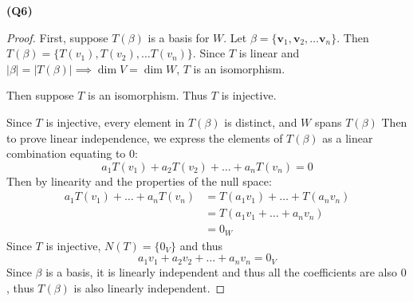 \documentclass[12pt, a4paper]{article}
\begin{document}
\textbf{(Q6)}

\begin{proof}
    First, suppose $T(\beta)$ is a basis for $W$. Let
    $\beta = \{\mathbf{v}_1, \mathbf{v}_2, \ldots \mathbf{v}_n\}$. Then
    $T(\beta) = \{T(v_1), T(v_2), \ldots T(v_n)\}$.
    Since $T$ is linear and $|\beta| = |T(\beta)| \implies \dim V = \dim W$,
    $T$ is an isomorphism.
    
    Then suppose $T$ is an isomorphism. Thus $T$ is injective.

    Since $T$ is injective, every element in $T(\beta)$ is distinct, and
    $W$ spans $T(\beta)$
    Then to prove linear independence, we express the elements of
    $T(\beta)$ as a linear combination equating to 0:
    \[
        a_1T(v_1) + a_2T(v_2) + \ldots + a_nT(v_n) = 0
    \]
    Then by linearity and the properties of the null space:
    \begin{align*}
        a_1T(v_1) + \ldots + a_nT(v_n) & = T(a_1v_1) + \ldots + T(a_nv_n)\\
        & = T(a_1v_1 + \ldots + a_nv_n)\\
        & = 0_W
    \end{align*}
    Since $T$ is injective, $N(T) = \{0_V\}$ and thus
    \[
        a_1v_1 + a_2v_2 + \ldots + a_nv_n = 0_V
    \]
    Since $\beta$ is a basis, it is linearly independent and thus
    all the coefficients are also $0$, thus $T(\beta)$ is also
    linearly independent.
\end{proof}
\end{document}
